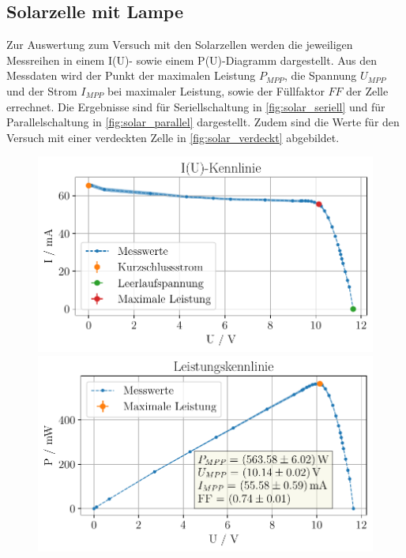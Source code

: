 \documentclass[english, ngerman]{scrartcl}
\begin{document}
\subsection{Solarzelle mit Lampe}
\label{subsec:auswertung_solar_lampe}
Zur Auswertung zum Versuch mit den Solarzellen werden die jeweiligen Messreihen in einem I(U)- sowie einem P(U)-Diagramm dargestellt. Aus den Messdaten wird der Punkt der maximalen Leistung $P_{MPP}$, die Spannung $U_{MPP}$ und der Strom $I_{MPP}$ bei maximaler Leistung, sowie der Füllfaktor $FF$ der Zelle errechnet. Die Ergebnisse sind für Seriellschaltung in \autoref{fig:solar_seriell} und für Parallelschaltung in \autoref{fig:solar_parallel} dargestellt. Zudem sind die Werte für den Versuch mit einer verdeckten Zelle in \autoref{fig:solar_verdeckt} abgebildet. 
\setcapindent{0pt}
\begin{figure}[H]
    \centering
    \begin{minipage}[t]{0.485\linewidth}
        \centering
        \includegraphics[width=\linewidth]{fig/plots/solar_seriell_UI_.pdf}
    \end{minipage}%
    \hspace*{\fill}
    \begin{minipage}[t]{0.485\linewidth}
        \centering
        \includegraphics[width=\linewidth]{fig/plots/solar_seriell_UP_.pdf}

\end{minipage}
\end{figure}
\end{document}
